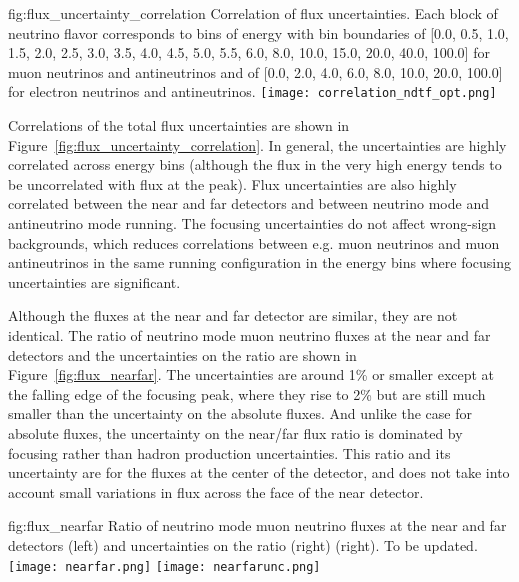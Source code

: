 \begin{dunefigure}{fig:flux_uncertainty_correlation}
{Correlation of flux uncertainties.  Each block of neutrino flavor corresponds to bins of energy with bin boundaries of [0.0, 0.5, 1.0, 1.5, 2.0, 2.5, 3.0, 3.5, 4.0, 4.5, 5.0, 5.5, 6.0, 8.0, 10.0, 15.0, 20.0, 40.0, 100.0] for muon neutrinos and antineutrinos and of [0.0, 2.0, 4.0, 6.0, 8.0, 10.0, 20.0, 100.0] for electron neutrinos and antineutrinos. }
    \texttt{[image: correlation\_ndtf\_opt.png]}\end{dunefigure}

Correlations of the total flux uncertainties are shown in Figure~\ref{fig:flux_uncertainty_correlation}.  In general, the uncertainties are highly correlated across energy bins (although the flux in the very high energy tends to be uncorrelated with flux at the peak).  Flux uncertainties are also highly correlated between the near and far detectors and between neutrino mode and antineutrino mode running.  The focusing uncertainties do not affect wrong-sign backgrounds, which reduces correlations between e.g. muon neutrinos and muon antineutrinos in the same running configuration in the energy bins where focusing uncertainties are significant.    

Although the fluxes at the near and far detector are similar, they are not identical.  The ratio of neutrino mode muon neutrino fluxes at the near and far detectors and the uncertainties on the ratio are shown in  Figure~\ref{fig:flux_nearfar}.  The uncertainties are around 1\% or smaller except at the falling edge of the focusing peak, where they rise to 2\% but are still much smaller than the uncertainty on the absolute fluxes.    And unlike the case for absolute fluxes, the uncertainty on the near/far flux ratio is dominated by focusing rather than hadron production uncertainties.  This ratio and its uncertainty are for the fluxes at the center of the detector, and does not take into account small variations in flux across the face of the near detector.     

\begin{dunefigure}{fig:flux_nearfar}
{Ratio of neutrino mode muon neutrino fluxes at the near and far detectors (left) and uncertainties on the ratio (right) (right).  To be updated. }
    \texttt{[image: nearfar.png]}
     \texttt{[image: nearfarunc.png]}
\end{dunefigure}


